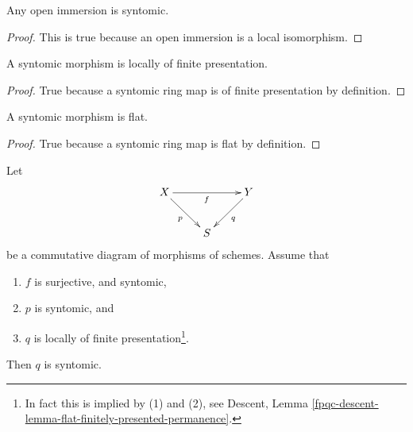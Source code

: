 \begin{lemma}
\label{lemma-open-immersion-syntomic}
Any open immersion is syntomic.
\end{lemma}

\begin{proof}
This is true because an open immersion is a local isomorphism.
\end{proof}

\begin{lemma}
\label{lemma-syntomic-locally-finite-presentation}
A syntomic morphism is locally of finite presentation.
\end{lemma}

\begin{proof}
True because a syntomic ring map is of finite presentation by
definition.
\end{proof}

\begin{lemma}
\label{lemma-syntomic-flat}
A syntomic morphism is flat.
\end{lemma}

\begin{proof}
True because a syntomic ring map is flat by definition.
\end{proof}

\begin{lemma}
\label{lemma-syntomic-permanence}
Let
$$
\xymatrix{
X \ar[rr]_f \ar[rd]_p & &
Y \ar[dl]^q \\
& S
}
$$
be a commutative diagram of morphisms of schemes. Assume that
\begin{enumerate}
\item $f$ is surjective, and syntomic,
\item $p$ is syntomic, and
\item $q$ is locally of finite presentation\footnote{In fact this
is implied by (1) and (2), see
Descent, Lemma \ref{fpqc-descent-lemma-flat-finitely-presented-permanence}.}.
\end{enumerate}
Then $q$ is syntomic.
\end{lemma}


